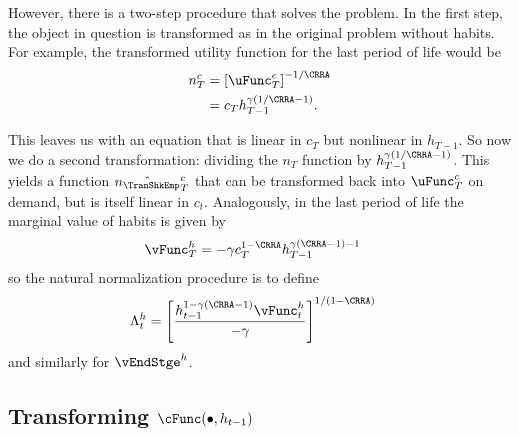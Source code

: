 \documentclass[titlepage, headings=optiontotocandhead]{\econtex}
\begin{document}
{  However, there is a two-step procedure that solves the problem.  In
  the first step, the object in question is transformed as in the
  original problem without habits.  For example, the transformed utility
  function for the last period of life would be
  \begin{equation}\begin{gathered}\begin{aligned}
        n_{T}^{c}  & = \left[\uFunc^{c}_{T}\right]^{-1/\CRRA}
        \\        & = {c}_{T}h_{T-1}^{\gamma(1/\CRRA-1)}.
      \end{aligned}\end{gathered}\end{equation}

  This leaves us with an equation that is linear in ${c}_{T}$ but
  nonlinear in $h_{T-1}$.  So now we do a second transformation:
  dividing the $n_{T}$ function by $h_{T-1}^{\gamma(1/\CRRA-1)}$.  This
  yields a function $\hat{n_{\TranShkEmp}}_{T}^{c}$ that can be transformed back into
  $\uFunc^{c}_{T}$ on demand, but is itself linear in ${c}_{t}.$  Analogously,
  in the last period of life the marginal value of habits is given by
  \begin{equation*}\begin{gathered}\begin{aligned}
        {\vFunc}_{T}^{h}  & = -\gamma {c}_{T}^{1-\CRRA}h_{T-1}^{\gamma(\CRRA-1)-1}
      \end{aligned}\end{gathered}\end{equation*}
  so the natural normalization procedure is to define
  \begin{equation}\begin{gathered}\begin{aligned}
        \Lambda_{t}^{h} 
        & =                           \left[\frac{h_{t-1}^{1-\gamma(\CRRA-1)}{\vFunc}_{t}^{h}}{-\gamma}\right]^{1/(1-\CRRA)}
      \end{aligned}\end{gathered}\end{equation}
  and similarly for $\vEndStge^{h}$.


  \hypertarget{Transforming-cFunc}{}
  \subsection{Transforming $\cFunc(\bullet,h_{t-1})$}

}
\end{document}
